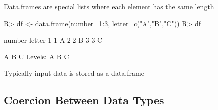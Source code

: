 \documentclass[fleqn, letter, 10pt]{article}
\begin{document}
Data.frames are special lists where each element has the same length
\begin{Schunk}
\begin{Sinput}
R> df <- data.frame(number=1:3, letter=c("A","B","C"))
R> df
\end{Sinput}
\begin{Soutput}
  number letter
1      1      A
2      2      B
3      3      C
\end{Soutput}
\begin{Soutput}
[1] A B C
Levels: A B C
\end{Soutput}
\end{Schunk}

Typically input data is stored as a data.frame.

\subsection{Coercion Between Data Types}
\end{document}
